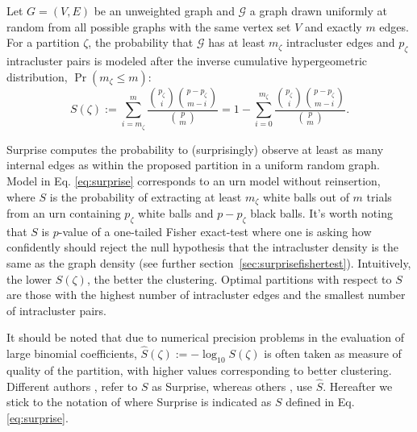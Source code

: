 Let $G=(V,E)$ be an unweighted graph and $\mathcal{G}$ a graph drawn uniformly at random from all possible graphs with the same vertex set $V$ and exactly $m$ edges. For a partition $\zeta$, the probability that $\mathcal{G}$ has at least $m_\zeta$ intracluster edges and $p_\zeta$ intracluster pairs is modeled after the inverse cumulative hypergeometric distribution, $\Pr( m_\zeta \leq m)$:
\begin{equation}\label{eq:surprise}
S(\zeta) := \sum_{i = m_\zeta}^m \dfrac{\binom{p_\zeta}{i} \binom{p-p_\zeta}{m-i} }{\binom{p}{m}} = 1- \sum_{i = 0}^{m_\zeta} \dfrac{\binom{p_\zeta}{i} \binom{p-p_\zeta}{m-i} }{\binom{p}{m}}.
\end{equation}

Surprise computes the probability to (surprisingly) observe at least as many internal edges as within the proposed partition in a uniform random graph. Model in Eq. \ref{eq:surprise}  corresponds to an urn model without reinsertion, where $S$ is the probability of extracting at least $m_\zeta$ white balls out of $m$ trials from an urn containing $p_\zeta$ white balls and $p-p_\zeta$ black balls. It's worth noting that $S$ is $p$-value of a one-tailed Fisher exact-test where one is asking how confidently should reject the null hypothesis that the intracluster density is the same as the graph density (see further section~\ref{sec:surprisefishertest}). Intuitively, the lower $S(\zeta)$, the better the clustering. Optimal partitions with respect to $S$ are those with the highest number of intracluster edges and the smallest number of intracluster pairs.

It should be noted that due to numerical precision problems in the evaluation of large binomial coefficients, $\hat{S}(\zeta) := -\log_{10}S(\zeta)$ is often taken as measure of quality of the partition, with higher values corresponding to better clustering. Different authors \cite{ArnauVMarsS2005}, \cite{Fleck2014} refer to $S$ as Surprise, whereas others \cite{Aldecoa2011}, \cite{Aldecoa2013} use $\hat{S}$. Hereafter we stick to the notation of \cite{Fleck2014} where Surprise is indicated as $S$ defined in Eq. \ref{eq:surprise}.

